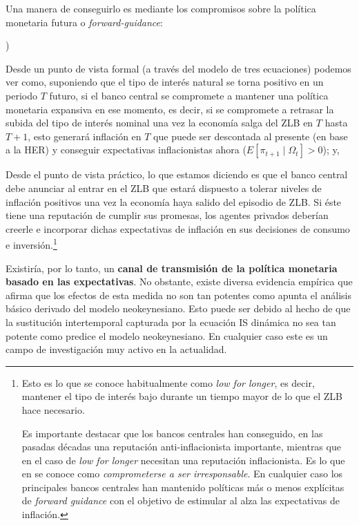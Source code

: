 \documentclass[10pt,a4paper]{article}
\newcounter{alphaitem}
\newenvironment{la}
      {\begin{list}{\alph{alphaitem})}{%
          \usecounter{alphaitem}%
          \setlength{\leftmargin}{1cm}%
          \setlength{\parskip}{3pt}%
          \setlength{\itemsep}{0pt}%
          \setlength{\parsep}{0pt}%
      }}
      {\end{list}}
\begin{document}
Una manera de conseguirlo es mediante los compromisos sobre la política monetaria futura o \textit{forward-guidance}:
\begin{la}
    \item Desde un punto de vista formal (a través del modelo de tres ecuaciones) podemos ver como, suponiendo que el tipo de interés natural se torna positivo en un periodo $T$ futuro, si el banco central se compromete a mantener una política monetaria expansiva en ese momento, es decir, si se compromete a retrasar la subida del tipo de interés nominal una vez la economía salga del ZLB en $T$ hasta $T+1$, esto generará inflación en $T$ que puede ser descontada al presente (en base a la HER) y conseguir expectativas inflacionistas ahora ($E[\pi_{t+1}\;|\;\Omega_t]>0$); y,
    \item Desde el punto de vista práctico, lo que estamos diciendo es que el banco central debe anunciar al entrar en el ZLB que estará dispuesto a tolerar niveles de inflación positivos una vez la economía haya salido del episodio de ZLB. Si éste tiene una reputación de cumplir sus promesas, los agentes privados deberían creerle e incorporar dichas expectativas de inflación en sus decisiones de consumo e inversión.\footnote{%
        Esto es lo que se conoce habitualmente como \textit{low for longer}, es decir, mantener el tipo de interés bajo durante un tiempo mayor de lo que el ZLB hace necesario. 
    
    Es importante destacar que los bancos centrales han conseguido, en las pasadas décadas una reputación anti-inflacionista importante, mientras que en el caso de \textit{low for longer} necesitan una reputación inflacionista. Es lo que en se conoce como \textit{comprometerse a ser irresponsable}. En cualquier caso los principales bancos centrales han mantenido políticas más o menos explícitas de \textit{forward guidance} con el objetivo de estimular al alza las expectativas de inflación.
    }
\end{la}

Existiría, por lo tanto, un \textbf{canal de transmisión de la política monetaria basado en las expectativas}. No obstante, existe diversa evidencia empírica que afirma que los efectos de esta medida no son tan potentes como apunta el análisis básico derivado del modelo neokeynesiano. Esto puede ser debido al hecho de que la sustitución intertemporal capturada por la ecuación IS dinámica no sea tan potente como predice el modelo neokeynesiano. En cualquier caso este es un campo de investigación muy activo en la actualidad.
\end{document}
